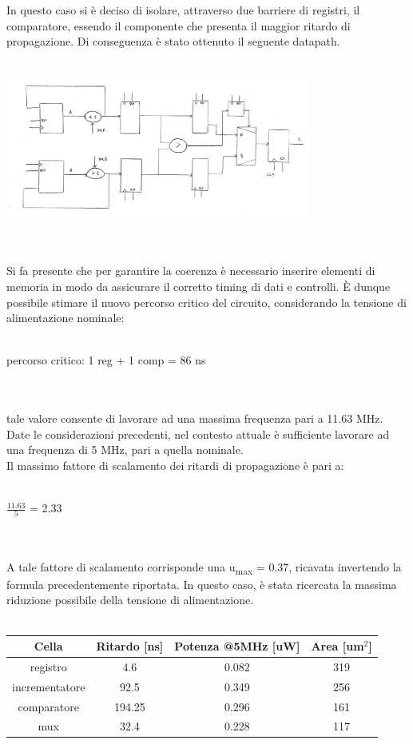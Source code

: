 \documentclass[11pt,  english, makeidx, a4paper, titlepage, oneside]{book}
\begin{document}
\\\\
In questo caso si è deciso di isolare, attraverso due barriere di registri, il comparatore, essendo il componente che presenta il maggior ritardo di propagazione. Di conseguenza è stato ottenuto il seguente datapath.
\\\\
\centerline{\includegraphics[width=10cm]{./img/Lab_3/datapath_pipeline.jpeg}}
\\\\
Si fa presente che per garantire la coerenza è necessario inserire elementi di memoria in modo da assicurare il corretto timing di dati e controlli.
È dunque possibile stimare il nuovo percorso critico del circuito, considerando la tensione di alimentazione nominale:
\\\\
\centerline{percorso critico: 1 reg + 1 comp = 86 ns}
\\\\
tale valore consente di lavorare ad una massima frequenza pari  a 11.63 MHz. Date le considerazioni precedenti, nel contesto attuale è sufficiente lavorare ad una frequenza di 5 MHz, pari a quella nominale.
\\
Il massimo fattore di scalamento dei ritardi di propagazione è pari a:
\\\\
\centerline{$\frac{11.63}{5}$ = 2.33}
\\\\
A tale fattore di scalamento corrisponde una u\textsubscript{max} = 0.37, ricavata invertendo la formula precedentemente riportata. In questo caso, è stata ricercata la massima riduzione possibile della tensione di alimentazione.
\\\\
\begin{center}
	\begin{tabular}{|c|c|c|c|}
	\hline
	Cella & Ritardo [ns] & Potenza @5MHz [uW] & Area [um$^2$] \\
	\hline
	 registro & 4.6 & 0.082 & 319 \\
	\hline
	 incrementatore & 92.5 & 0.349 & 256 \\
	\hline
	 comparatore & 194.25 & 0.296 & 161 \\
	\hline
	 mux & 32.4 & 0.228 & 117 \\
	\hline
	\end{tabular}	
\end{center}
\end{document}
